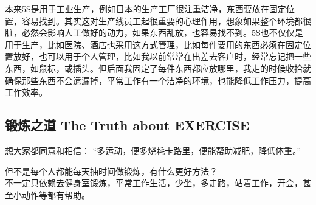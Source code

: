 本来5S是用于工业生产，例如日本的生产工厂很注重洁净，东西要放在固定位置，容易找到。其实这对生产线员工起很重要的心理作用，想象如果整个环境都很脏，必然会影响人工做好的动力，如果东西乱放，也容易找不到。5S也不仅仅是用于生产，比如医院、酒店也采用这方式管理，比如每件要用的东西必须在固定位置放好，也可以用于个人管理，比如我以前常常在出差去客户时，经常忘记把一些东西，如鼠标，或插头。但后面我固定了每件东西都应放哪里，我走的时候收拾就确保那些东西不会遗漏掉，平常工作有一个洁净的环境，也能降低工作压力，提高工作效率。



\hypertarget{ux953bux70bcux4e4bux9053-the-truth-about-exercise}{%
\subsection{锻炼之道 The Truth about
EXERCISE}\label{ux953bux70bcux4e4bux9053-the-truth-about-exercise}}

想大家都同意和相信：
``多运动，便多烧耗卡路里，便能帮助减肥，降低体重。''



但不是每个人都能每天抽时间做锻炼，有什么更好方法？\\
不一定只依赖去健身室锻炼，平常工作生活，少坐，多走路，站着工作，开会，甚至小动作等都有帮助。


